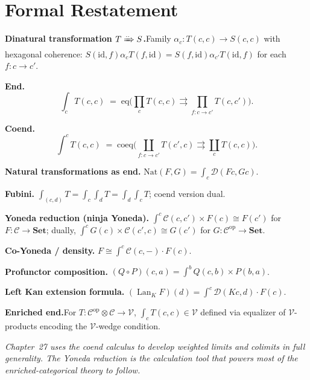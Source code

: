 \section*{Formal Restatement}

\begin{formalrestatement}
\textbf{Dinatural transformation $T \xRightarrow{..} S$.}\quad Family $\alpha_c
: T(c,c) \to S(c,c)$ with hexagonal coherence: $S(\mathrm{id}, f) \alpha_c
T(f, \mathrm{id}) = S(f, \mathrm{id}) \alpha_{c'} T(\mathrm{id}, f)$ for each
$f : c \to c'$.

\medskip
\textbf{End.}\quad
\begin{equation*}
  \int_c T(c, c) \;=\; \mathrm{eq}\bigl(
    \textstyle\prod_c T(c, c) \rightrightarrows
    \textstyle\prod_{f : c \to c'} T(c, c')
  \bigr).
\end{equation*}

\medskip
\textbf{Coend.}\quad
\begin{equation*}
  \int^c T(c, c) \;=\; \mathrm{coeq}\bigl(
    \textstyle\coprod_{f : c \to c'} T(c', c) \rightrightarrows
    \textstyle\coprod_c T(c, c)
  \bigr).
\end{equation*}

\medskip
\textbf{Natural transformations as end.}\quad
$\mathrm{Nat}(F, G) = \int_c \mathcal{D}(Fc, Gc)$.

\medskip
\textbf{Fubini.}\quad
$\int_{(c,d)} T = \int_c \int_d T = \int_d \int_c T$; coend version dual.

\medskip
\textbf{Yoneda reduction (ninja Yoneda).}\quad
$\int^c \mathcal{C}(c, c') \times F(c) \cong F(c')$ for $F : \mathcal{C} \to
\mathbf{Set}$; dually, $\int^c G(c) \times \mathcal{C}(c', c) \cong G(c')$
for $G : \mathcal{C}^{\mathrm{op}} \to \mathbf{Set}$.

\medskip
\textbf{Co-Yoneda / density.}\quad
$F \cong \int^c \mathcal{C}(c, -) \cdot F(c)$.

\medskip
\textbf{Profunctor composition.}\quad
$(Q \circ P)(c, a) = \int^b Q(c, b) \times P(b, a)$.

\medskip
\textbf{Left Kan extension formula.}\quad
$(\operatorname{Lan}_K F)(d) = \int^c \mathcal{D}(Kc, d) \cdot F(c)$.

\medskip
\textbf{Enriched end.}\quad For $T : \mathcal{C}^{\mathrm{op}} \otimes \mathcal{C}
\to \mathcal{V}$, $\int_c T(c, c) \in \mathcal{V}$ defined via equalizer of
$\mathcal{V}$-products encoding the $\mathcal{V}$-wedge condition.

\medskip
\noindent\textit{Chapter~27 uses the coend calculus to develop \emph{weighted
limits and colimits} in full generality. The Yoneda reduction is the
calculation tool that powers most of the enriched-categorical theory to
follow.}
\end{formalrestatement}
